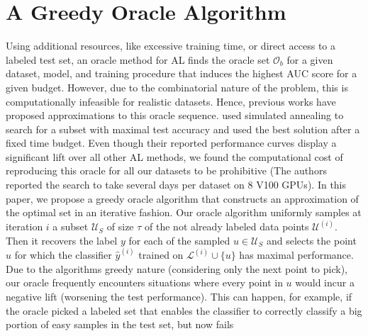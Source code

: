 \documentclass[]{article}
\begin{document}
\section{A Greedy Oracle Algorithm}\label{sec:oracle} 
Using additional resources, like excessive training time, or direct access to a labeled test set, an oracle method for AL finds the oracle set $\mathcal{O}_b$ for a given dataset, model, and
training procedure that induces the highest AUC score for a given budget.
However, due to the combinatorial nature of the problem, this is computationally
infeasible for realistic datasets. Hence, previous works have proposed
approximations to this oracle sequence. \cite{zhou2021towards} used simulated
annealing to search for a subset with maximal test accuracy and used the best solution
after a fixed time budget. 
Even though their reported performance curves display
a significant lift over all other AL methods, we found the
computational cost of reproducing this oracle for all our datasets to be
prohibitive (The authors reported the search to take several days per dataset on
8 V100 GPUs). In this paper, we propose a greedy oracle algorithm that
constructs an approximation of the optimal set in an iterative fashion. 
Our oracle algorithm
uniformly samples at iteration $i$ a subset $\mathcal{U}_S$ of size $\tau$ of the not already
labeled data points $\mathcal{U}^{(i)}$.
Then it recovers the label $y$ for each of the sampled $u \in \mathcal{U}_S$ and selects the
point $u$ for which the classifier $\hat{y}^{(i)}$ trained on
$\mathcal{L}^{(i)} \cup \{u\}$ has maximal performance.
Due to the algorithms greedy nature (considering only the next point to pick),
our oracle frequently encounters situations where every point in $u$ would
incur a negative lift (worsening the test performance). This can happen, for
example, if the oracle picked a labeled set that enables the classifier to
correctly classify a big portion of easy samples in the test set, but now fails
\end{document}
